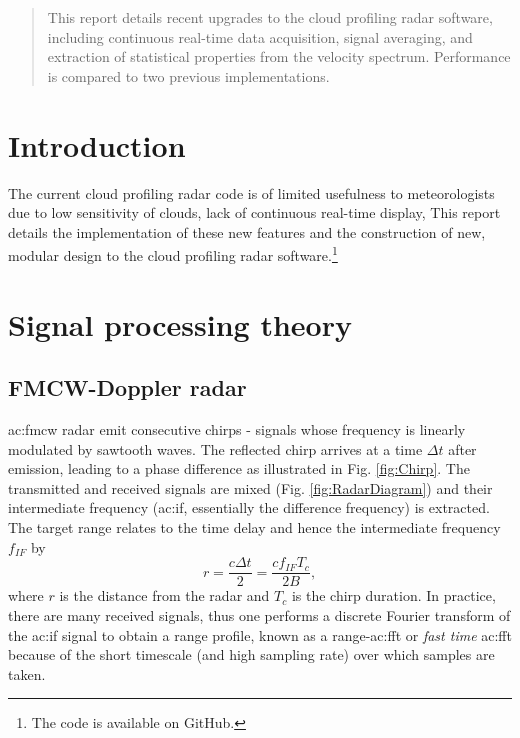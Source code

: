 \documentclass{article}
\begin{document}
\begin{abstract}
	This report details recent upgrades to the cloud profiling radar software, including continuous real-time data acquisition, signal averaging, and extraction of statistical properties from the velocity spectrum. Performance is compared to two previous implementations.
\end{abstract}

\tableofcontents
\clearpage
\printglossary

\section{Introduction}
The current cloud profiling radar code is of limited usefulness to meteorologists due to low sensitivity of clouds, lack of continuous real-time display, 
This report details the implementation of these new features and the construction of new, modular design to the cloud profiling radar software.\footnote{The code is available on GitHub.\supercite{Code}}

\section{Signal processing theory}
\subsection{FMCW-Doppler radar}
\acrshort{ac:fmcw} radar emit consecutive chirps - signals whose frequency is linearly modulated by sawtooth waves. The reflected chirp arrives at a time \(\Delta t\) after emission, leading to a phase difference as illustrated in Fig. \ref{fig:Chirp}. The transmitted and received signals are mixed (Fig. \ref{fig:RadarDiagram}) and their intermediate frequency (\acrshort{ac:if}, essentially the difference frequency) is extracted. The target range relates to the time delay and hence the intermediate frequency \(f_{IF}\) by
\begin{equation}
	r = \frac{c \Delta t}{2} = \frac{c f_{IF} T_c}{2 B},
\end{equation}
where \(r\) is the distance from the radar and \(T_c\) is the chirp duration.\supercite{TIFMCWDoppler}
In practice, there are many received signals, thus one performs a discrete Fourier transform of the \acrshort{ac:if} signal to obtain a range profile, known as a range-\acrshort{ac:fft} or \textit{fast time} \acrshort{ac:fft} because of the short timescale (and high sampling rate) over which samples are taken.
\end{document}
